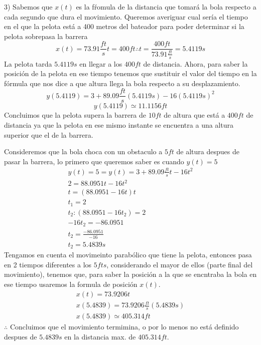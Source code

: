     3) Sabemos que $x(t)$ es la fŕomula de la distancia que tomará la bola respecto a cada segundo que dura el movimiento. Queremos averiguar cual sería el tiempo en el que la pelota está a 400 metros del bateador para poder determinar si la pelota sobrepasa la barrera
    $$x(t)=73.91\frac{ft}{s}t=400ft\therefore t=\frac{400ft}{73.91\frac{ft}{s}}=5.4119s$$
    La pelota tarda $5.4119s$ en llegar a los $400 ft$ de distancia.
    Ahora, para saber la posición de la pelota en ese tiempo tenemos que sustituir el valor del tiempo en la fórmula que nos dice a que altura llega la bola respecto a su desplazamiento.
    $$y(5.4119)=3+89.09\frac{ft}{s}(5.4119s)-16(5.4119s)^2$$
        $$y(5.4119) \simeq 11.1156ft$$
    Concluimos que la pelota supera la barrera de $10ft$ de altura que está a $400 ft$ de distancia ya que la pelota en ese mismo instante se encuentra a una altura superior que el de la barrera.
    
    \vspace{5mm} %
    
    Consideremos que la bola choca con un obstaculo a $5ft$ de altura despues de pasar la barrera, lo primero que queremos saber es cuando $y(t)=5$
    \begin{gather*}
        y(t)=5=y(t)=3+89.09\frac{ft}{s}t-16t^2\\
        2=88.0951t-16t^2\\
        t=(88.0951-16t)t\\
        t_1=2\\
        t_2:(88.0951-16t_2)=2\\
        -16t_2=-86.0951\\
        t_2=\frac{-86.0951}{-16}\\
        t_2=5.4839s
    \end{gather*}
    Tengamos en cuenta el movimeinto parabólico que tiene la pelota, entonces pasa en 2 tiempos diferentes a los $5 fts$, considerando el mayor de ellos (parte final del movimiento), tenemos que, para saber la posición a la que se encntraba la bola en ese tiempo usaremos la formula de posición $x(t)$.
    \begin{gather*}
        x(t)=73.9206t\\
        x(5.4839)=73.9206\frac{ft}{s}(5.4839s)\\
        x(5.4839)\simeq405.314ft
    \end{gather*}
    $\therefore$ Concluimos que el movimiento termimina, o por lo menos no está definido despues de $5.4839s$ en la distancia max. de $405.314ft$.
    
